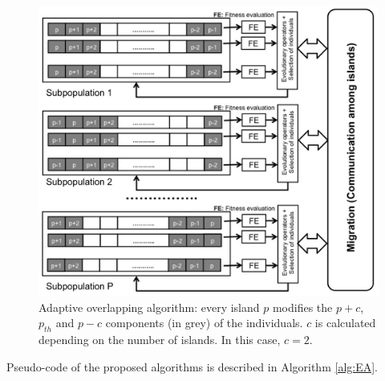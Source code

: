 \documentclass[preprint]{elsarticle}
\begin{document}
\begin{figure}
\centering
\includegraphics[width=12cm]{islandAdaptive.jpg}
\caption{Adaptive overlapping algorithm: every island $p$ modifies the  $p+c$,
  $p_{th}$ and $p-c$  components (in grey) of the individuals. $c$ is calculated depending on the number of islands. In this case, $c=2$.}
  \label{fig:adaptive}
\end{figure}

Pseudo-code of the proposed algorithms is described in Algorithm \ref{alg:EA}.
\end{document}
